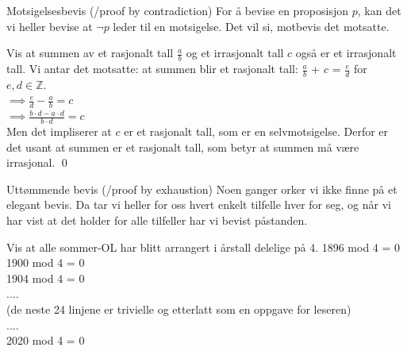 \begin{frame}{Motsigelsesbevis (/proof by contradiction)}
    For å bevise en proposisjon $p$, kan det vi heller bevise at $\lnot p$ leder til en motsigelse. Det vil si, motbevis det motsatte.
    
    \pause
    \begin{block}{Vis at summen av et rasjonalt tall $\frac{a}{b}$ og et irrasjonalt tall $c$ også er et irrasjonalt tall.}
    Vi antar det motsatte: at summen blir et rasjonalt tall: $\frac{a}{b}$ + $c$ = $\frac{e}{d}$ for $e, d \in \mathbb{Z}$.\\
    $\implies \frac{e}{d} - \frac{a}{b} = c$\\
    $\implies \frac{b\cdot d - a \cdot d}{b\cdot d} = c$\\
    Men det impliserer at $c$ er et rasjonalt tall, som er en selvmotsigelse. Derfor er det usant at summen er et rasjonalt tall, som betyr at summen må være irrasjonal. 
    \qed
    
    \end{block}
\end{frame}

\begin{frame}{Uttømmende bevis (/proof by exhaustion)}
    Noen ganger orker vi ikke finne på et elegant bevis. Da tar vi heller for oss hvert enkelt tilfelle hver for seg, og når vi har vist at det holder for alle tilfeller har vi bevist påstanden. \\
    
    \pause
    \begin{block}{Vis at alle sommer-OL har blitt arrangert i årstall delelige på 4.}
        1896 mod 4 = 0 \checkmark \\
        1900 mod 4 = 0 \checkmark \\
        1904 mod 4 = 0 \checkmark \\
        .... \\
        (de neste 24 linjene er trivielle og etterlatt som en oppgave for leseren)\\
        ....\\
        2020 mod 4 = 0 \checkmark
    \end{block}
\end{frame}

